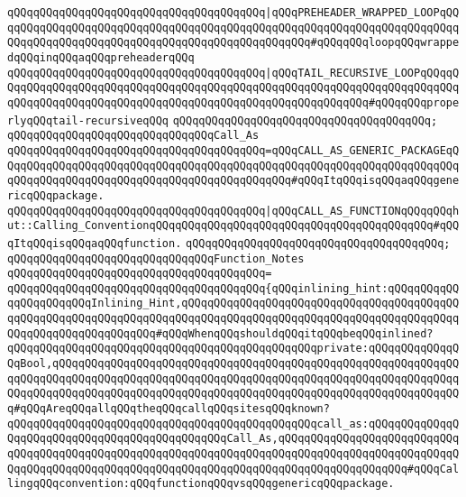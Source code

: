 \verb|qQQqqQQqqQQqqQQqqQQqqQQqqQQqqQQqqQQqqQQq|\verb#|qQQqPREHEADER_WRAPPED_LOOPqQQqqQQqqQQqqQQqqQQqqQQqqQQqqQQqqQQqqQQqqQQqqQQqqQQqqQQqqQQqqQQqqQQqqQQqqQQqqQQqqQQqqQQqqQQqqQQqqQQqqQQqqQQqqQQqqQQqqQQq#\verb|#qQQqqQQqloopqQQqwrappedqQQqinqQQqaqQQqpreheaderqQQq|\newline
\verb|qQQqqQQqqQQqqQQqqQQqqQQqqQQqqQQqqQQqqQQq|\verb#|qQQqTAIL_RECURSIVE_LOOPqQQqqQQqqQQqqQQqqQQqqQQqqQQqqQQqqQQqqQQqqQQqqQQqqQQqqQQqqQQqqQQqqQQqqQQqqQQqqQQqqQQqqQQqqQQqqQQqqQQqqQQqqQQqqQQqqQQqqQQqqQQqqQQqqQQq#\verb|#qQQqqQQqproperlyqQQqtail-recursiveqQQq|\newline
\verb|qQQqqQQqqQQqqQQqqQQqqQQqqQQqqQQqqQQqqQQq;|\newline
\newline
\verb|qQQqqQQqqQQqqQQqqQQqqQQqqQQqqQQqCall_As|\newline
\verb|qQQqqQQqqQQqqQQqqQQqqQQqqQQqqQQqqQQqqQQq=qQQqCALL_AS_GENERIC_PACKAGEqQQqqQQqqQQqqQQqqQQqqQQqqQQqqQQqqQQqqQQqqQQqqQQqqQQqqQQqqQQqqQQqqQQqqQQqqQQqqQQqqQQqqQQqqQQqqQQqqQQqqQQqqQQqqQQqqQQq#qQQqItqQQqisqQQqaqQQqgenericqQQqpackage.|\newline
\verb|qQQqqQQqqQQqqQQqqQQqqQQqqQQqqQQqqQQqqQQq|\verb#|qQQqCALL_AS_FUNCTIONqQQqqQQqhut::Calling_ConventionqQQqqQQqqQQqqQQqqQQqqQQqqQQqqQQqqQQqqQQqqQQq#\verb|#qQQqItqQQqisqQQqaqQQqfunction.|\newline
\verb|qQQqqQQqqQQqqQQqqQQqqQQqqQQqqQQqqQQqqQQq;|\newline
\newline
\verb|qQQqqQQqqQQqqQQqqQQqqQQqqQQqqQQqFunction_Notes|\newline
\verb|qQQqqQQqqQQqqQQqqQQqqQQqqQQqqQQqqQQqqQQq=|\newline
\verb|qQQqqQQqqQQqqQQqqQQqqQQqqQQqqQQqqQQqqQQq{qQQqinlining_hint:qQQqqQQqqQQqqQQqqQQqqQQqInlining_Hint,qQQqqQQqqQQqqQQqqQQqqQQqqQQqqQQqqQQqqQQqqQQqqQQqqQQqqQQqqQQqqQQqqQQqqQQqqQQqqQQqqQQqqQQqqQQqqQQqqQQqqQQqqQQqqQQqqQQqqQQqqQQqqQQqqQQqqQQq#qQQqWhenqQQqshouldqQQqitqQQqbeqQQqinlined?|\newline
\verb|qQQqqQQqqQQqqQQqqQQqqQQqqQQqqQQqqQQqqQQqqQQqqQQqprivate:qQQqqQQqqQQqqQQqBool,qQQqqQQqqQQqqQQqqQQqqQQqqQQqqQQqqQQqqQQqqQQqqQQqqQQqqQQqqQQqqQQqqQQqqQQqqQQqqQQqqQQqqQQqqQQqqQQqqQQqqQQqqQQqqQQqqQQqqQQqqQQqqQQqqQQqqQQqqQQqqQQqqQQqqQQqqQQqqQQqqQQqqQQqqQQqqQQqqQQqqQQqqQQqqQQqqQQqqQQqqQQq#qQQqAreqQQqallqQQqtheqQQqcallqQQqsitesqQQqknown?|\newline
\verb|qQQqqQQqqQQqqQQqqQQqqQQqqQQqqQQqqQQqqQQqqQQqqQQqcall_as:qQQqqQQqqQQqqQQqqQQqqQQqqQQqqQQqqQQqqQQqqQQqqQQqCall_As,qQQqqQQqqQQqqQQqqQQqqQQqqQQqqQQqqQQqqQQqqQQqqQQqqQQqqQQqqQQqqQQqqQQqqQQqqQQqqQQqqQQqqQQqqQQqqQQqqQQqqQQqqQQqqQQqqQQqqQQqqQQqqQQqqQQqqQQqqQQqqQQqqQQqqQQqqQQqqQQq#qQQqCallingqQQqconvention:qQQqfunctionqQQqvsqQQqgenericqQQqpackage.|\newline
